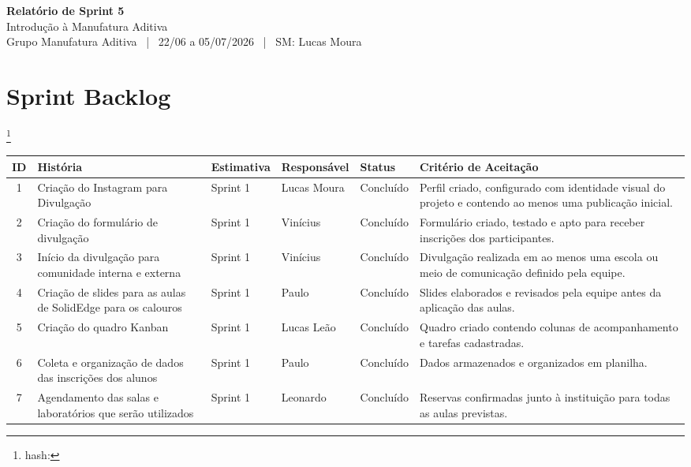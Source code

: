 \documentclass[12pt,a4paper]{article}
\newcommand{\projetotitulo}{Introdução à Manufatura Aditiva}
\newcommand{\grupoid}{Grupo Manufatura Aditiva}
\newcommand{\sprintnum}{5}
\newcommand{\sprintperiodo}{22/06 a 05/07/2026}
\newcommand{\scrummaster}{Lucas Moura}
\newcommand{\gitcommit}{} %
\begin{document}
\begin{center}
{\Large\bfseries Relatório de Sprint \sprintnum}\\
{\large \projetotitulo}\\
\grupoid{} \ | \ \sprintperiodo{} \ | \ SM: \scrummaster
\end{center}

\section{Sprint Backlog}
\footnote{hash: \gitcommit}

\begin{longtable}{|c|p{3.8cm}|p{1.9cm}|p{2.2cm}|p{1.7cm}|p{4.2cm}|}
\toprule
ID & História & Estimativa & Responsável & Status & Critério de Aceitação \\
\midrule
1 & Criação do Instagram para Divulgação & Sprint 1 & Lucas Moura & Concluído & Perfil criado, configurado com identidade visual do projeto e contendo ao menos uma publicação inicial. \\ \hline

2 & Criação do formulário de divulgação & Sprint 1 & Vinícius & Concluído & Formulário criado, testado e apto para receber inscrições dos participantes. \\ \hline

3 & Início da divulgação para comunidade interna e externa & Sprint 1 & Vinícius & Concluído & Divulgação realizada em ao menos uma escola ou meio de comunicação definido pela equipe. \\ \hline

4 & Criação de slides para as aulas de SolidEdge para os calouros & Sprint 1 & Paulo & Concluído & Slides elaborados e revisados pela equipe antes da aplicação das aulas. \\ \hline

5 & Criação do quadro Kanban & Sprint 1 & Lucas Leão & Concluído & Quadro criado contendo colunas de acompanhamento e tarefas cadastradas. \\ \hline

6 & Coleta e organização de dados das inscrições dos alunos & Sprint 1 & Paulo & Concluído & Dados armazenados e organizados em planilha. \\ \hline

7 & Agendamento das salas e laboratórios que serão utilizados & Sprint 1 & Leonardo & Concluído & Reservas confirmadas junto à instituição para todas as aulas previstas. \\ \hline


\end{longtable}
\end{document}
